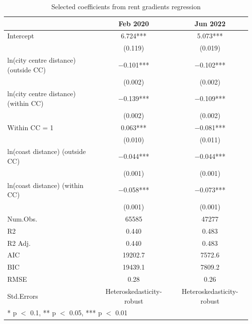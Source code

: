 \documentclass[10pt,openany,leqno]{e61-research-note}
\begin{document}
\begin{table}[ht]
\centering
\caption{Selected coefficients from rent gradients regression}\label{tab:pre-post-regs}
\begin{tabular}{lcc}
\toprule
  & Feb 2020 & Jun 2022\\
\midrule
Intercept & \num{6.724}*** & \num{5.073}***\\
 & (\num{0.119}) & (\num{0.019})\\
ln(city centre distance) (outside CC) & \num{-0.101}*** & \num{-0.102}***\\
 & (\num{0.002}) & \vphantom{1} (\num{0.002})\\
ln(city centre distance) (within CC) & \num{-0.139}*** & \num{-0.109}***\\
 & (\num{0.002}) & (\num{0.002})\\
Within CC = 1 & \num{0.063}*** & \num{-0.081}***\\
 & (\num{0.010}) & (\num{0.011})\\
ln(coast distance) (outside CC) & \num{-0.044}*** & \num{-0.044}***\\
 & (\num{0.001}) & \vphantom{1} (\num{0.001})\\
ln(coast distance) (within CC) & \num{-0.058}*** & \num{-0.073}***\\
 & (\num{0.001}) & (\num{0.001})\\
\midrule
Num.Obs. & \num{65585} & \num{47277}\\
R2 & \num{0.440} & \num{0.483}\\
R2 Adj. & \num{0.440} & \num{0.483}\\
AIC & \num{19202.7} & \num{7572.6}\\
BIC & \num{19439.1} & \num{7809.2}\\
RMSE & \num{0.28} & \num{0.26}\\
Std.Errors & Heteroskedasticity-robust & Heteroskedasticity-robust\\
\bottomrule
\multicolumn{3}{l}{\rule{0pt}{1em}* p $<$ 0.1, ** p $<$ 0.05, *** p $<$ 0.01}\\
\end{tabular}
\end{table}
\end{document}
